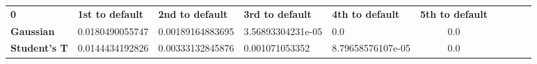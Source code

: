 \begin{tabular}{|l|l|l|l|l|c|c|c|c|c|}
\hline
\textbf{0} & \textbf{1st to default} & \textbf{2nd to default} & \textbf{3rd to default} & \textbf{4th to default} & \textbf{5th to default}\\\hhline{|=|=|=|=|=|=|}
\textbf{Gaussian} & 0.0180490055747 & 0.00189164883695 & 3.56893304231e-05 & 0.0 & 0.0\\
\textbf{Student's T} & 0.0144434192826 & 0.00333132845876 & 0.001071053352 & 8.79658576107e-05 & 0.0\\
\hline
\end{tabular}
